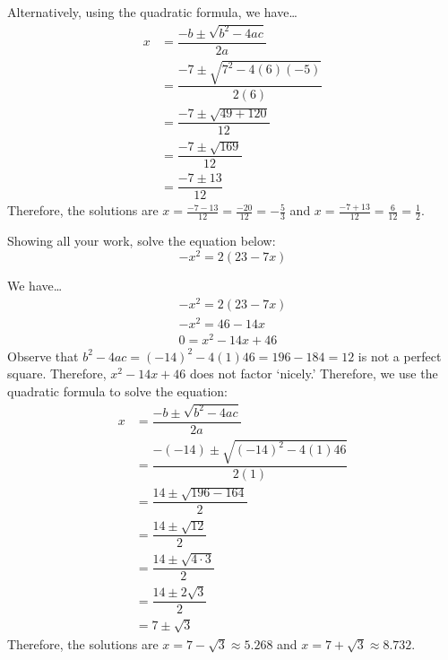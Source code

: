 \documentclass[12pt,letterpaper]{exam}
\begin{document}
\begin{questions}
Alternatively, using the quadratic formula, we have\dots
	\[
	\begin{aligned}
	x&= \dfrac{-b \pm \sqrt{b^2 - 4ac}}{2a} \\[0.3cm]
	&= \dfrac{-7 \pm \sqrt{7^2 - 4(6)(-5)}}{2(6)} \\[0.3cm]
	&= \dfrac{-7 \pm \sqrt{49 + 120}}{12} \\[0.3cm]
	&= \dfrac{-7 \pm \sqrt{169}}{12} \\[0.3cm]
	&= \dfrac{-7 \pm 13}{12}
	\end{aligned}	
	\]
Therefore, the solutions are $x= \frac{-7 - 13}{12}= \frac{-20}{12}= -\frac{5}{3}$ and $x= \frac{-7 + 13}{12}= \frac{6}{12}= \frac{1}{2}$. 



\newpage
\question[10] Showing all your work, solve the equation below:
	\[
	-x^2= 2(23 - 7x)
	\] \pspace

\sol We have\dots
	\[
	\begin{gathered}
	-x^2= 2(23 - 7x) \\[0.3cm]
	-x^2= 46 - 14x \\[0.3cm]
	0= x^2 - 14x + 46
	\end{gathered}
	\]
Observe that $b^2 - 4ac= (-14)^2 - 4(1)46= 196 - 184= 12$ is not a perfect square. Therefore, $x^2 - 14x + 46$ does not factor `nicely.' Therefore, we use the quadratic formula to solve the equation:
	\[
	\begin{aligned}
	x&= \dfrac{-b \pm \sqrt{b^2 - 4ac}}{2a} \\[0.3cm]
	&= \dfrac{-(-14) \pm \sqrt{(-14)^2 - 4(1)46}}{2(1)} \\[0.3cm]
	&= \dfrac{14 \pm \sqrt{196 - 164}}{2} \\[0.3cm]
	&= \dfrac{14 \pm \sqrt{12}}{2} \\[0.3cm]
	&= \dfrac{14 \pm \sqrt{4 \cdot 3}}{2} \\[0.3cm]
	&= \dfrac{14 \pm 2 \sqrt{3}}{2} \\[0.3cm]
	&= 7 \pm \sqrt{3}
	\end{aligned}	
	\]
Therefore, the solutions are $x= 7 - \sqrt{3} \approx 5.268$ and $x= 7 + \sqrt{3} \approx 8.732$. 


\end{questions}
\end{document}
